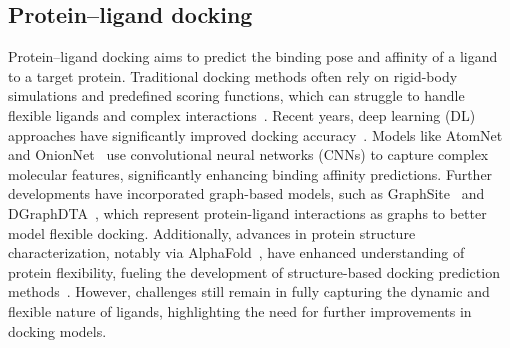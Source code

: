 \subsection{Protein–ligand docking}
Protein–ligand docking aims to predict the binding pose and affinity of a ligand to a target protein. 
Traditional docking methods often rely on rigid-body simulations and predefined scoring functions, which can struggle to handle flexible ligands and complex interactions~\cite{kramer1999evaluation, totrov1997flexible}.
Recent years, deep learning (DL) approaches have significantly improved docking accuracy~\cite{yang2022protein}. Models like AtomNet~\cite{stafford2022atomnet} and OnionNet~\cite{wang2021onionnet} use convolutional neural networks (CNNs) to capture complex molecular features, significantly enhancing binding affinity predictions.
Further developments have incorporated graph-based models, such as GraphSite~\cite{shi2022graphsite} and DGraphDTA~\cite{yang2022mgraphdta}, which represent protein-ligand interactions as graphs to better model flexible docking. 
Additionally, advances in protein structure characterization, notably via AlphaFold~\cite{evans2021protein}, have enhanced understanding of protein flexibility, fueling the development of structure-based docking prediction methods~\cite{wong2022benchmarking, johansson2022improving}.
However, challenges still remain in fully capturing the dynamic and flexible nature of ligands, highlighting the need for further improvements in docking models.